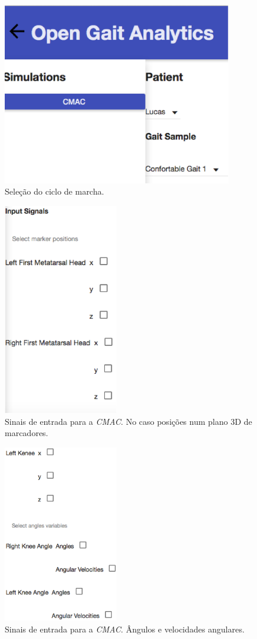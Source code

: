 \begin{figure}[ht]
	\centering
	\includegraphics[width=10cm]{figuras/tela28.eps}
	\caption{Seleção do ciclo de marcha.}
\label{tela28}
\end{figure}

\begin{figure}[ht]
	\centering
	\includegraphics[width=5cm]{figuras/tela29.eps}
	\caption{Sinais de entrada para a \emph{CMAC}. No caso posições num plano 3D de marcadores.}
\label{tela29}
\end{figure}

\begin{figure}[ht]
	\centering
	\includegraphics[width=5cm]{figuras/tela30.eps}
	\caption{Sinais de entrada para a \emph{CMAC}. Ângulos e velocidades angulares.}
\label{tela30}
\end{figure}


